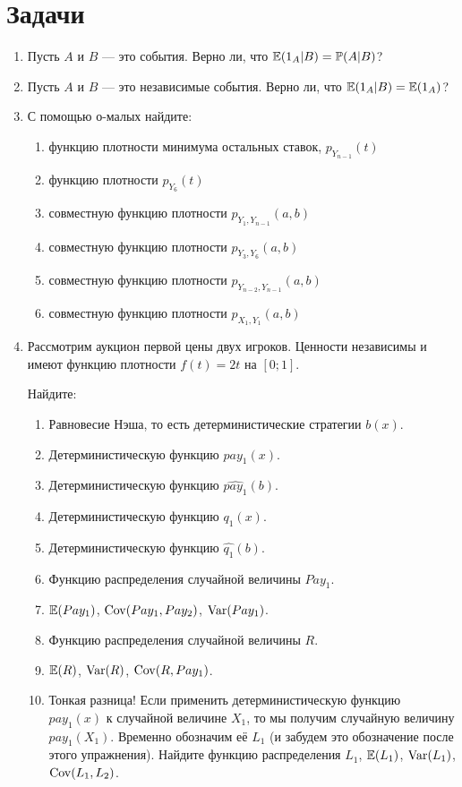 
\section{Задачи}
\begin{enumerate}

\item Пусть $ A $ и $ B $ — это события. Верно ли, что $ \operatorname{\mathbb{E}}(1_{A}|B)=\operatorname{\mathbb{P}}(A|B) $?

\item Пусть $ A $ и $ B $ — это независимые события. Верно ли, что $ \operatorname{\mathbb{E}}(1_{A}|B)=\operatorname{\mathbb{E}}(1_{A})  $?

\item С помощью о-малых найдите: 

\begin{enumerate}
\item функцию плотности минимума остальных ставок, $ p_{Y_{n-1}}(t) $
\item функцию плотности $ p_{Y_{6}}(t) $
\item совместную функцию плотности $ p_{Y_{1},Y_{n-1}}(a,b) $
\item совместную функцию плотности $ p_{Y_{3},Y_{6}}(a,b) $
\item совместную функцию плотности $ p_{Y_{n-2},Y_{n-1}}(a,b) $
\item совместную функцию плотности $ p_{X_{1},Y_{1}}(a,b) $
\end{enumerate}

\item Рассмотрим аукцион первой цены двух игроков. Ценности независимы и имеют функцию плотности $f(t)=2t  $ на $ [0;1] $.

Найдите:
\begin{enumerate}
\item Равновесие Нэша, то есть детерминистические стратегии $ b(x) $.
\item Детерминистическую функцию $ pay_{1}(x) $.
\item Детерминистическую функцию $ \widehat{pay_{1}}(b) $.
\item Детерминистическую функцию $ q_{1}(x) $.
\item Детерминистическую функцию $ \widehat{q_{1}}(b) $.
\item Функцию распределения случайной величины $ Pay_{1} $.
\item $ \operatorname{\mathbb{E}}(Pay_{1}) $, $ \operatorname{Cov}(Pay_{1},Pay_{2}) $, $ \operatorname{Var}(Pay_{1}) $.
\item Функцию распределения случайной величины $ R $.
\item $ \operatorname{\mathbb{E}}(R) $, $ \operatorname{Var}(R) $, $ \operatorname{Cov}(R,Pay_{1}) $.
\item Тонкая разница! Если применить детерминистическую функцию $ pay_{1}(x) $ к случайной величине $ X_{1} $, то мы получим случайную величину $ pay_{1}(X_{1}) $. Временно обозначим её $ L_{1} $ (и забудем это обозначение после этого упражнения). Найдите функцию распределения $ L_{1} $, $ \operatorname{\mathbb{E}}(L_{1}) $, $ \operatorname{Var}(L_{1}) $, $ \operatorname{Cov}(L_{1},L_{2}) $.


\end{enumerate}
\end{enumerate}
